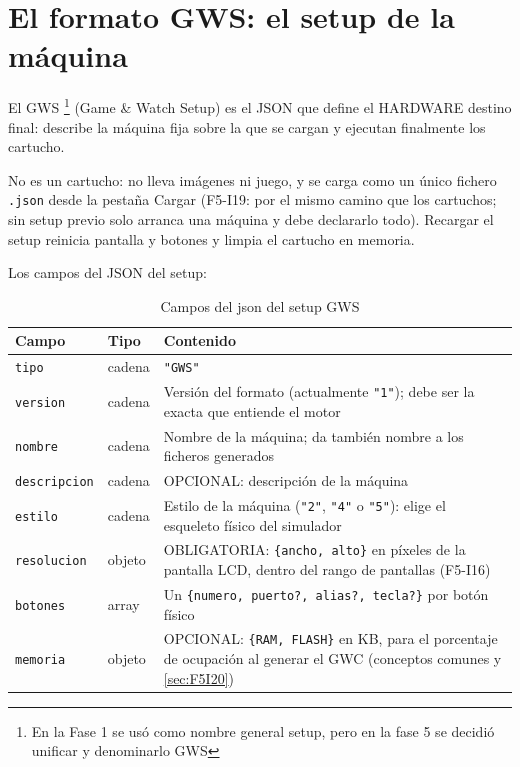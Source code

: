 \section{El formato GWS: el setup de la máquina}
\label{sec:A02GWS}


El GWS \footnote{En la Fase 1 se usó como nombre general setup, pero en la fase 5 se decidió unificar y denominarlo GWS} (Game \& Watch Setup) es el JSON que define el HARDWARE destino final: describe la
máquina fija sobre la que se cargan y ejecutan finalmente los cartucho. 

No es un cartucho: no lleva imágenes ni juego, y se carga como un único
fichero \texttt{.json} desde la pestaña Cargar (F5-I19: por el mismo
camino que los cartuchos; sin setup previo solo arranca una máquina y
debe declararlo todo). Recargar el setup
reinicia pantalla y botones y limpia el cartucho en memoria.

Los campos del JSON del setup:

\begin{table}[H]
	\centering
	\begin{tabular}{llp{10cm}}
		\toprule
		Campo & Tipo & Contenido \\
		\midrule
		\texttt{tipo} & cadena & \texttt{"GWS"}\footnotemark \\
		\texttt{version} & cadena & Versión del formato (actualmente \texttt{"1"}); debe ser la exacta que entiende el motor \\
		\texttt{nombre} & cadena & Nombre de la máquina; da también nombre a los ficheros generados \\
		\texttt{descripcion} & cadena & OPCIONAL: descripción de la máquina \\
		\texttt{estilo} & cadena & Estilo de la máquina (\texttt{"2"}, \texttt{"4"} o \texttt{"5"}): elige el esqueleto físico del simulador \\
		\texttt{resolucion} & objeto & OBLIGATORIA: \texttt{\{ancho, alto\}} en píxeles de la pantalla LCD, dentro del rango de pantallas (F5-I16) \\
		\texttt{botones} & array & Un \texttt{\{numero, puerto?, alias?, tecla?\}} por botón físico \\
		\texttt{memoria} & objeto & OPCIONAL: \texttt{\{RAM, FLASH\}} en KB, para el porcentaje de ocupación al generar el GWC (conceptos comunes y \ref{sec:F5I20}) \\
		\bottomrule
	\end{tabular}
	\caption{Campos del json del setup GWS}
	\label{tab:A02GWS}
\end{table}


